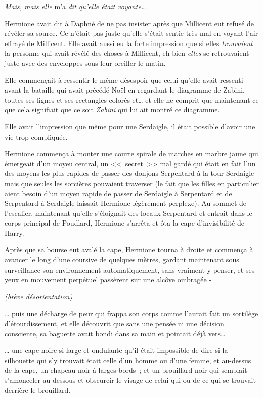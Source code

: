 \emph{Mais, mais elle} m'a \emph{dit qu'elle était voyante…}

Hermione avait dit à Daphné de ne pas insister après que Millicent eut refusé de révéler sa source. Ce n'était pas juste qu'elle s'était sentie très mal en voyant l'air effrayé de Millicent. Elle avait aussi eu la forte impression que si elles \emph{trouvaient} la personne qui avait révélé des choses à Millicent, eh bien \emph{elles} se retrouvaient juste avec des enveloppes sous leur oreiller le matin.

Elle commençait à ressentir le même désespoir que celui qu'elle avait ressenti avant la bataille qui avait précédé Noël en regardant le diagramme de Zabini, toutes ses lignes et ses rectangles colorés et… et elle ne comprit que maintenant ce que cela signifiait que ce soit \emph{Zabini} qui lui ait montré ce diagramme.

Elle avait l'impression que même pour une Serdaigle, il était possible d'avoir une vie trop compliquée.

Hermione commença à monter une courte spirale de marches en marbre jaune qui émergeait d'un moyeu central, un <<~secret~>> mal gardé qui était en fait l'un des moyens les plus rapides de passer des donjons Serpentard à la tour Serdaigle mais que seules les sorcières pouvaient traverser (le fait que les filles en particulier aient besoin d'un moyen rapide de passer de Serdaigle à Serpentard et de Serpentard à Serdaigle laissait Hermione légèrement perplexe). Au sommet de l'escalier, maintenant qu'elle s'éloignait des locaux Serpentard et entrait dans le corps principal de Poudlard, Hermione s'arrêta et ôta la cape d'invisibilité de Harry.

Après que sa bourse eut avalé la cape, Hermione tourna à droite et commença à avancer le long d'une coursive de quelques mètres, gardant maintenant sous surveillance son environnement automatiquement, sans vraiment y penser, et ses yeux en mouvement perpétuel passèrent sur une alcôve ombragée -

\emph{(brève désorientation)}

… puis une décharge de peur qui frappa son corps comme l'aurait fait un sortilège d'étourdissement, et elle découvrit que sans une pensée ni une décision consciente, sa baguette avait bondi dans sa main et pointait déjà vers…

… une cape noire si large et ondulante qu'il était impossible de dire si la silhouette qui s'y trouvait était celle d'un homme ou d'une femme, et au-dessus de la cape, un chapeau noir à larges bords~; et un brouillard noir qui semblait s'amonceler au-dessous et obscurcir le visage de celui qui ou de ce qui se trouvait derrière le brouillard.

